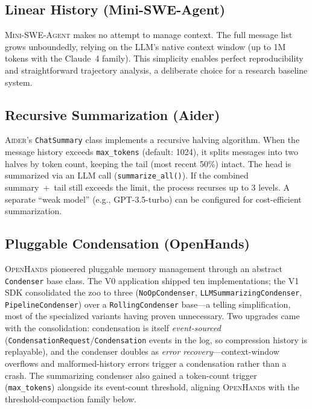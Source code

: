 \documentclass[11pt,a4paper]{article}
\newcommand{\oh}{\textsc{OpenHands}\xspace}
\newcommand{\adr}{\textsc{Aider}\xspace}
\newcommand{\mswe}{\textsc{Mini-SWE-Agent}\xspace}
\begin{document}
\subsection{Linear History (Mini-SWE-Agent)}

\mswe{} makes no attempt to manage context.
The full message list grows unboundedly, relying on the LLM's native context window (up to 1M tokens with the Claude~4 family).
This simplicity enables perfect reproducibility and straightforward trajectory analysis, a deliberate choice for a research baseline system.

\subsection{Recursive Summarization (Aider)}

\adr{}'s \texttt{ChatSummary} class implements a recursive halving algorithm.
When the message history exceeds \texttt{max\_tokens} (default: 1024), it splits messages into two halves by token count, keeping the tail (most recent 50\%) intact.
The head is summarized via an LLM call (\texttt{summarize\_all()}).
If the combined summary~+~tail still exceeds the limit, the process recurses up to 3 levels.
A separate ``weak model'' (e.g., GPT-3.5-turbo) can be configured for cost-efficient summarization.

\subsection{Pluggable Condensation (OpenHands)}

\oh{} pioneered pluggable memory management through an abstract \texttt{Condenser} base class.
The V0 application shipped ten implementations; the V1 SDK consolidated the zoo to three (\texttt{NoOpCondenser}, \texttt{LLMSummarizingCondenser}, \texttt{PipelineCondenser}) over a \texttt{RollingCondenser} base---a telling simplification, most of the specialized variants having proven unnecessary.
Two upgrades came with the consolidation: condensation is itself \emph{event-sourced} (\texttt{CondensationRequest}/\texttt{Condensation} events in the log, so compression history is replayable), and the condenser doubles as \emph{error recovery}---context-window overflows and malformed-history errors trigger a condensation rather than a crash.
The summarizing condenser also gained a token-count trigger (\texttt{max\_tokens}) alongside its event-count threshold, aligning \oh{} with the threshold-compaction family below.
\end{document}
